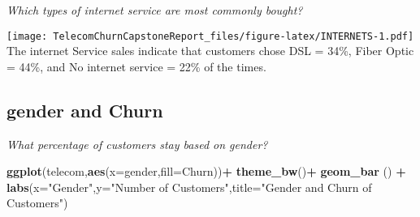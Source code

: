 \documentclass[]{article}
\newenvironment{Shaded}{\begin{snugshade}}{\end{snugshade}}
\newcommand{\KeywordTok}[1]{\textcolor[rgb]{0.13,0.29,0.53}{\textbf{#1}}}
\newcommand{\DataTypeTok}[1]{\textcolor[rgb]{0.13,0.29,0.53}{#1}}
\newcommand{\DecValTok}[1]{\textcolor[rgb]{0.00,0.00,0.81}{#1}}
\newcommand{\FloatTok}[1]{\textcolor[rgb]{0.00,0.00,0.81}{#1}}
\newcommand{\StringTok}[1]{\textcolor[rgb]{0.31,0.60,0.02}{#1}}
\newcommand{\OtherTok}[1]{\textcolor[rgb]{0.56,0.35,0.01}{#1}}
\newcommand{\OperatorTok}[1]{\textcolor[rgb]{0.81,0.36,0.00}{\textbf{#1}}}
\newcommand{\NormalTok}[1]{#1}
\begin{document}
\emph{Which types of internet service are most commonly bought?}

\begin{Shaded}
\end{Shaded}

\texttt{[image: TelecomChurnCapstoneReport\_files/figure-latex/INTERNETS-1.pdf]}
The internet Service sales indicate that customers chose DSL = 34\%,
Fiber Optic = 44\%, and No internet service = 22\% of the times.

\subsection{gender and Churn}\label{gender-and-churn}

\emph{What percentage of customers stay based on gender?}

\begin{Shaded}
\begin{Highlighting}[]
\KeywordTok{ggplot}\NormalTok{(telecom,}\KeywordTok{aes}\NormalTok{(}\DataTypeTok{x=}\NormalTok{gender,}\DataTypeTok{fill=}\NormalTok{Churn))}\OperatorTok{+}
\StringTok{  }\KeywordTok{theme_bw}\NormalTok{()}\OperatorTok{+}
\StringTok{  }\KeywordTok{geom_bar}\NormalTok{ () }\OperatorTok{+}
\StringTok{  }\KeywordTok{labs}\NormalTok{(}\DataTypeTok{x=}\StringTok{"Gender"}\NormalTok{,}\DataTypeTok{y=}\StringTok{"Number of Customers"}\NormalTok{,}\DataTypeTok{title=}\StringTok{"Gender and Churn of Customers"}\NormalTok{)}
\end{Highlighting}
\end{Shaded}
\end{document}
